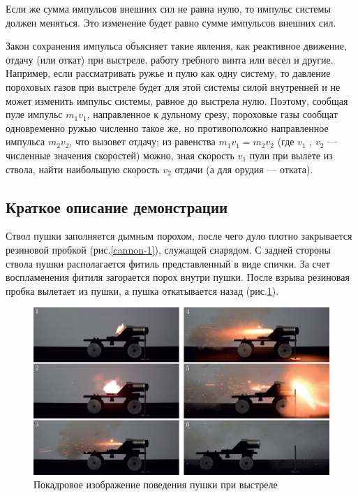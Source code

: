 \documentclass[All.tex]{subfiles}
\begin{document}
Если же сумма импульсов внешних сил не равна нулю, то импульс системы должен меняться. 
Это изменение будет равно сумме импульсов внешних сил.

Закон сохранения импульса объясняет такие явления, как реактивное движение, отдачу (или откат) при выстреле, работу гребного винта или весел и другие.
Например, если рассматривать ружье и пулю как одну систему, то давление пороховых газов при выстреле будет для этой системы силой внутренней и не может изменить импульс системы, равное до выстрела нулю. Поэтому, сообщая пуле импульс $ m_{1}v_{1} $, направленное к дульному срезу, пороховые газы сообщат одновременно ружью численно такое же, но противоположно направленное импульса $ m_{2}v_{2} $, что вызовет отдачу; из равенства  $ m_{1}v_{1} = m_{2}v_{2} $ (где $ v_{1} $ , $ v_{2} $ — численные значения скоростей) можно, зная скорость $ v_{1} $ пули при вылете из ствола, найти наибольшую скорость $ v_{2} $ отдачи (а для орудия — отката).

\subsection*{\textcolor{PineGreen}{Краткое описание демонстрации}}

Ствол пушки заполняется дымным порохом, после чего дуло плотно закрывается резиновой пробкой (рис.\ref{cannon-1}), служащей снарядом.
С задней стороны ствола пушки располагается фитиль представленный в виде спички.
За счет воспламенения фитиля загорается порох внутри пушки.
После взрыва резиновая пробка вылетает из пушки, а пушка откатывается назад (рис.\ref{cannon-2}).

\begin{figure}
	\centering 	
	\includegraphics[width=0.9\linewidth]{cannon-2.png}
	\caption{Покадровое изображение поведения пушки при выстреле}
	\label{cannon-2}
\end{figure}
\end{document}
